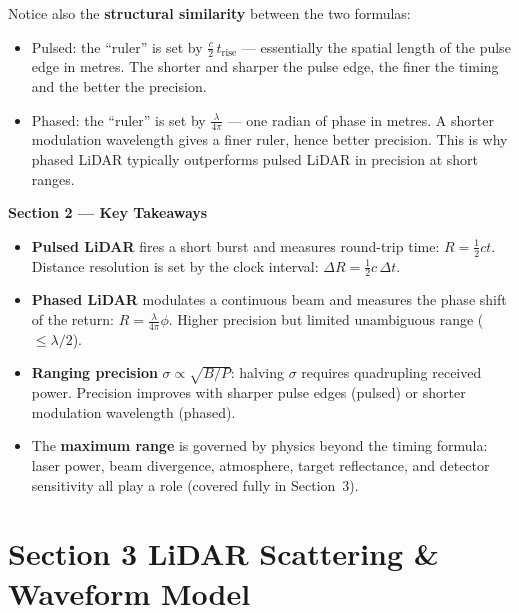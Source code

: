 \documentclass[12pt, a4paper]{article}
\begin{document}
\begin{notebox}
  Notice also the \textbf{structural similarity} between the two formulas:
  \begin{itemize}[leftmargin=1.2em,itemsep=2pt]
    \item Pulsed: the ``ruler'' is set by $\tfrac{c}{2}\,t_{\text{rise}}$
      --- essentially the spatial length of the pulse edge in metres.
      The shorter and sharper the pulse edge, the finer the timing and the
      better the precision.
    \item Phased: the ``ruler'' is set by $\tfrac{\lambda}{4\pi}$
      --- one radian of phase in metres.  A shorter modulation wavelength
      gives a finer ruler, hence better precision.  This is why phased LiDAR
      typically outperforms pulsed LiDAR in precision at short ranges.
  \end{itemize}
\end{notebox}

\begin{keybox}
  \textbf{Section 2 --- Key Takeaways}
  \begin{itemize}[leftmargin=1.2em,itemsep=2pt]
    \item \textbf{Pulsed LiDAR} fires a short burst and measures round-trip
      time: $R = \tfrac{1}{2}ct$.  Distance resolution is set by the clock
      interval: $\Delta R = \tfrac{1}{2}c\,\Delta t$.
    \item \textbf{Phased LiDAR} modulates a continuous beam and measures the
      phase shift of the return: $R = \tfrac{\lambda}{4\pi}\phi$.
      Higher precision but limited unambiguous range ($\leq \lambda/2$).
    \item \textbf{Ranging precision} $\sigma \propto \sqrt{B/P}$: halving
      $\sigma$ requires quadrupling received power.  Precision improves with
      sharper pulse edges (pulsed) or shorter modulation wavelength (phased).
    \item The \textbf{maximum range} is governed by physics beyond the timing
      formula: laser power, beam divergence, atmosphere, target reflectance,
      and detector sensitivity all play a role (covered fully in Section~3).
  \end{itemize}
\end{keybox}

\newpage
\section*{Section 3 \quad LiDAR Scattering \& Waveform Model}
\end{document}
